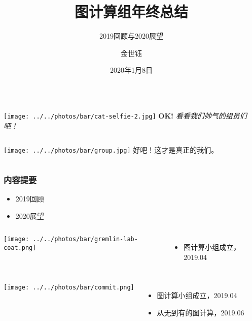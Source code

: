 \documentclass{beamer}
\title[总结]{图计算组年终总结}
\subtitle{2019回顾与2020展望}
\author{金世钰}
\date{2020年1月8日}
\begin{document}
\maketitle

  \begin{frame}
      \begin{columns}
       \texttt{[image: ../../photos/bar/cat-selfie-2.jpg]}
       \textbf{OK!} \textit{看看我们帅气的组员们吧！}
      \end{columns}
  \end{frame}
  \begin{frame}
      \begin{columns}
       \texttt{[image: ../../photos/bar/group.jpg]}
       好吧！这才是真正的我们。
      \end{columns}
  \end{frame}

  \begin{frame}
  \frametitle{内容提要}
    \begin{itemize}
      \item{2019回顾}
      \item{2020展望}
    \end{itemize}
  \end{frame}
  
  \begin{frame}
  \begin{columns}
  \texttt{[image: ../../photos/bar/gremlin-lab-coat.png]}

  \begin{itemize}
  \item 图计算小组成立，2019.04
  \end{itemize}
  \end{columns}

  \end{frame}
  
  \begin{frame}
  \begin{columns}
  \texttt{[image: ../../photos/bar/commit.png]}

  \begin{itemize}
  \item 图计算小组成立，2019.04
  \item 从无到有的图计算，2019.06
  \end{itemize}
  \end{columns}
  \end{frame}
\end{document}
